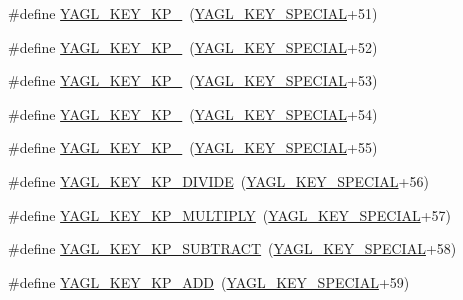 \begin{DoxyCompactItemize}
\item 
\#define \hyperlink{group____consts__key__mouse_ga3d70751c6bbb05b6c59e6e1a57141dec}{Y\-A\-G\-L\-\_\-\-K\-E\-Y\-\_\-\-K\-P\-\_}~(\hyperlink{group____consts__key__mouse_gae6060c5e0a8f15c67d28e1a1f0765d7b}{Y\-A\-G\-L\-\_\-\-K\-E\-Y\-\_\-\-S\-P\-E\-C\-I\-A\-L}+51)
\item 
\#define \hyperlink{group____consts__key__mouse_ga342276596fe2dc8fdc84ceac8372bb70}{Y\-A\-G\-L\-\_\-\-K\-E\-Y\-\_\-\-K\-P\-\_}~(\hyperlink{group____consts__key__mouse_gae6060c5e0a8f15c67d28e1a1f0765d7b}{Y\-A\-G\-L\-\_\-\-K\-E\-Y\-\_\-\-S\-P\-E\-C\-I\-A\-L}+52)
\item 
\#define \hyperlink{group____consts__key__mouse_gac9efd9169eb0ed68a5c3eac17d70d551}{Y\-A\-G\-L\-\_\-\-K\-E\-Y\-\_\-\-K\-P\-\_}~(\hyperlink{group____consts__key__mouse_gae6060c5e0a8f15c67d28e1a1f0765d7b}{Y\-A\-G\-L\-\_\-\-K\-E\-Y\-\_\-\-S\-P\-E\-C\-I\-A\-L}+53)
\item 
\#define \hyperlink{group____consts__key__mouse_ga5f708af7e174b3002d3a8b58e1ae13bd}{Y\-A\-G\-L\-\_\-\-K\-E\-Y\-\_\-\-K\-P\-\_}~(\hyperlink{group____consts__key__mouse_gae6060c5e0a8f15c67d28e1a1f0765d7b}{Y\-A\-G\-L\-\_\-\-K\-E\-Y\-\_\-\-S\-P\-E\-C\-I\-A\-L}+54)
\item 
\#define \hyperlink{group____consts__key__mouse_ga4fe02a25e8bc250c3cf56f9f9517aa95}{Y\-A\-G\-L\-\_\-\-K\-E\-Y\-\_\-\-K\-P\-\_}~(\hyperlink{group____consts__key__mouse_gae6060c5e0a8f15c67d28e1a1f0765d7b}{Y\-A\-G\-L\-\_\-\-K\-E\-Y\-\_\-\-S\-P\-E\-C\-I\-A\-L}+55)
\item 
\#define \hyperlink{group____consts__key__mouse_gaa9f894bb5a1efc9bde0cbdad667a74ea}{Y\-A\-G\-L\-\_\-\-K\-E\-Y\-\_\-\-K\-P\-\_\-\-D\-I\-V\-I\-D\-E}~(\hyperlink{group____consts__key__mouse_gae6060c5e0a8f15c67d28e1a1f0765d7b}{Y\-A\-G\-L\-\_\-\-K\-E\-Y\-\_\-\-S\-P\-E\-C\-I\-A\-L}+56)
\item 
\#define \hyperlink{group____consts__key__mouse_ga56a31d7e85e32a8f1d4d1f0dbbe4edca}{Y\-A\-G\-L\-\_\-\-K\-E\-Y\-\_\-\-K\-P\-\_\-\-M\-U\-L\-T\-I\-P\-L\-Y}~(\hyperlink{group____consts__key__mouse_gae6060c5e0a8f15c67d28e1a1f0765d7b}{Y\-A\-G\-L\-\_\-\-K\-E\-Y\-\_\-\-S\-P\-E\-C\-I\-A\-L}+57)
\item 
\#define \hyperlink{group____consts__key__mouse_ga460f0a0fac9c343f9c2dfe29998ac192}{Y\-A\-G\-L\-\_\-\-K\-E\-Y\-\_\-\-K\-P\-\_\-\-S\-U\-B\-T\-R\-A\-C\-T}~(\hyperlink{group____consts__key__mouse_gae6060c5e0a8f15c67d28e1a1f0765d7b}{Y\-A\-G\-L\-\_\-\-K\-E\-Y\-\_\-\-S\-P\-E\-C\-I\-A\-L}+58)
\item 
\#define \hyperlink{group____consts__key__mouse_ga868d718468cd9a57af0f82f7e45f9536}{Y\-A\-G\-L\-\_\-\-K\-E\-Y\-\_\-\-K\-P\-\_\-\-A\-D\-D}~(\hyperlink{group____consts__key__mouse_gae6060c5e0a8f15c67d28e1a1f0765d7b}{Y\-A\-G\-L\-\_\-\-K\-E\-Y\-\_\-\-S\-P\-E\-C\-I\-A\-L}+59)

\end{DoxyCompactItemize}
